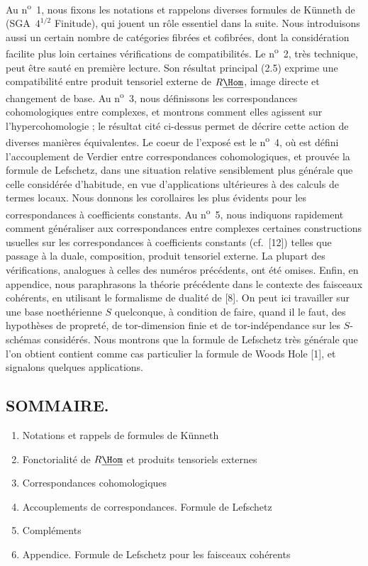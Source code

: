 Au n\textsuperscript{o}~1, nous fixons les notations et rappelons diverses formules de Künneth de (SGA~$4^{1/2}$ Finitude), qui jouent un rôle essentiel dans la suite. Nous introduisons aussi un certain nombre de catégories fibrées et cofibrées, dont la considération facilite plus loin certaines vérifications de compatibilités. Le n\textsuperscript{o}~2, très technique, peut être sauté en première lecture. Son résultat principal (2.5) exprime une compatibilité entre produit tensoriel externe de $R\underline{\Hom}$, image directe et changement de base. Au n\textsuperscript{o}~3, nous définissons les correspondances cohomologiques entre complexes, et montrons comment elles agissent sur l'hypercohomologie ; le résultat cité ci-dessus permet de décrire cette action de diverses manières équivalentes. Le coeur de l'exposé est le n\textsuperscript{o}~4, où est défini l'accouplement de Verdier entre correspondances cohomologiques, et prouvée la formule de Lefschetz, dans une situation relative sensiblement plus générale que celle considérée d'habitude, en vue d'applications ultérieures à des calculs de termes locaux. Nous donnons les corollaires les plus évidents pour les correspondances à coefficients constants. Au n\textsuperscript{o}~5, nous indiquons rapidement comment généraliser aux correspondances entre complexes certaines constructions usuelles sur les correspondances à coefficients constants (cf.~[12]) telles que passage à la duale, composition, produit tensoriel externe. La plupart des vérifications, analogues à celles des numéros précédents, ont été omises. Enfin, en appendice, nous paraphrasons la théorie précédente dans le contexte des faisceaux cohérents, en utilisant le formalisme de dualité de [8]. On peut ici travailler sur une base noethérienne $S$ quelconque, à condition de faire, quand il le faut, des hypothèses de propreté, de tor-dimension finie et de tor-indépendance sur les $S$-schémas considérés. Nous montrons que la formule de Lefschetz très générale que l'on obtient contient comme cas particulier la formule de Woods Hole [1], et signalons quelques applications.

\subsection*{SOMMAIRE.}
\begin{enumerate}[label=\arabic*.]
\item
Notations et rappels de formules de Künneth
\item Fonctorialité de $R\underline{\Hom}$ et produits tensoriels externes
\item Correspondances cohomologiques
\item Accouplements de correspondances. Formule de Lefschetz
\item Compléments
\item Appendice. Formule de Lefschetz pour les faisceaux cohérents
\end{enumerate}

